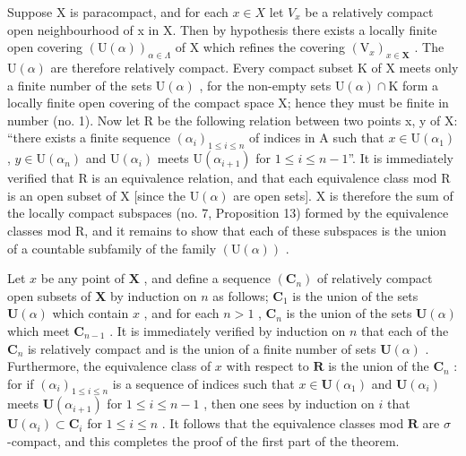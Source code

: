 Suppose X is paracompact, and for each \(x \in X\) let \(V_x\) be a relatively compact open neighbourhood of x in X. Then by hypothesis there exists a locally finite open covering \((\mathrm{U}(\alpha))_{\alpha \in \Lambda}\) of X which refines the covering \((\mathrm{V}_x)_{x \in \mathbf{X}}\) . The \(\mathrm{U}(\alpha)\) are therefore relatively compact. Every compact subset K of X meets only a finite number of the sets \(\mathrm{U}(\alpha)\) , for the non-empty sets \(\mathrm{U}(\alpha) \cap \mathrm{K}\) form a locally finite open covering of the compact space X; hence they must be finite in number (no. 1). Now let R be the following relation between two points x, y of X: ``there exists a finite sequence \((\alpha_i)_{1 \leqslant i \leqslant n}\) of indices in A such that \(x \in \mathrm{U}(\alpha_1)\) , \(y \in \mathrm{U}(\alpha_n)\) and \(\mathrm{U}(\alpha_i)\) meets \(\mathrm{U}(\alpha_{i+1})\) for \(1 \leqslant i \leqslant n - 1\)''. It is immediately verified that R is an equivalence relation, and that each equivalence class mod R is an open subset of X {[}since the \(\mathrm{U}(\alpha)\) are open sets{]}. X is therefore the sum of the locally compact subspaces (no. 7, Proposition 13) formed by the equivalence classes mod R, and it remains to show that each of these subspaces is the union of a countable subfamily of the family \((\mathrm{U}(\alpha))\) .

Let \(x\) be any point of \(\mathbf{X}\) , and define a sequence \((\mathbf{C}_n)\) of relatively compact open subsets of \(\mathbf{X}\) by induction on \(n\) as follows; \(\mathbf{C}_1\) is the union of the sets \(\mathbf{U}(\alpha)\) which contain \(x\) , and for each \(n > 1\) , \(\mathbf{C}_n\) is the union of the sets \(\mathbf{U}(\alpha)\) which meet \(\mathbf{C}_{n-1}\) . It is immediately verified by induction on \(n\) that each of the \(\mathbf{C}_n\) is relatively compact and is the union of a finite number of sets \(\mathbf{U}(\alpha)\) . Furthermore, the equivalence class of \(x\) with respect to \(\mathbf{R}\) is the union of the \(\mathbf{C}_n\) : for if \((\alpha_i)_{1 \leqslant i \leqslant n}\) is a sequence of indices such that \(x \in \mathbf{U}(\alpha_1)\) and \(\mathbf{U}(\alpha_i)\) meets \(\mathbf{U}(\alpha_{i+1})\) for \(1 \leqslant i \leqslant n - 1\) , then one sees by induction on \(i\) that \(\mathbf{U}(\alpha_i) \subset \mathbf{C}_i\) for \(1 \leqslant i \leqslant n\) . It follows that the equivalence classes mod \(\mathbf{R}\) are \(\sigma\) -compact, and this completes the proof of the first part of the theorem.

